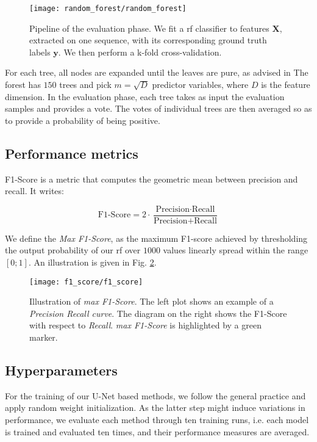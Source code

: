 \begin{figure}[htbp]
  \centering
  \texttt{[image: random\_forest/random\_forest]}
  \caption[Evaluation pipeline]{Pipeline of the evaluation phase. We fit a \gls{rf} classifier to features $\boldsymbol{X}$, extracted on one sequence, with its corresponding ground truth labels $\boldsymbol{y}$.
    We then perform a k-fold cross-validation.}
  \label{fig:random_forest}
\end{figure}

For each tree, all nodes are expanded until the leaves are pure, as advised in \cite[pg. 596]{hastie09}
The forest has $150$ trees and pick $m=\sqrt{D}$ predictor variables, where $D$ is the feature dimension.
In the evaluation phase, each tree takes as input the evaluation samples and provides a vote.
The votes of individual trees are then averaged so as to provide a probability of being positive.

\subsection{Performance metrics}
F1-Score is a metric that computes the geometric mean between precision and recall.
It writes:

\begin{equation}
\textrm{F1-Score} = 2 \cdot \frac{\textrm{Precision} \cdot \textrm{Recall}}{\textrm{Precision} + \textrm{Recall}}
\label{eq:f1_score}
\end{equation}
\hspace{6pt}

We define the \textit{Max F1-Score}, as the maximum F1-score achieved by thresholding the output probability of our \gls{rf} over $1000$ values linearly spread within the range $[0;1]$.
An illustration is given in Fig. \ref{fig:f1_score}.

\begin{figure}[ht]
  \centering
  \texttt{[image: f1\_score/f1\_score]}
  \caption[Illustration of max F1-Score]{Illustration of \textit{max F1-Score}. The left plot shows an example of a \textit{Precision Recall curve}. The diagram on the right shows the F1-Score with respect to \textit{Recall}. \textit{max F1-Score} is highlighted by a green marker.}
  \label{fig:f1_score}
\end{figure}

\subsection{Hyperparameters} \label{ch:eval_configs}
For the training of our U-Net based methods, we follow the general practice and apply random weight initialization.
As the latter step might induce variations in performance, we evaluate each method through ten training runs, i.e. each model is trained and evaluated ten times, and their performance measures are averaged.

